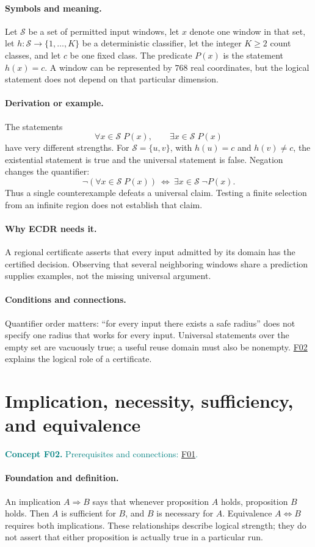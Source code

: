 \documentclass[11pt,a4paper]{article}
\newcommand{\conceptid}{Front matter}
\newcommand{\concept}[3]{\clearpage\renewcommand{\conceptid}{#1}%
\section{#2}\label{concept:#1}%
\textcolor{teal}{\textbf{Concept #1.} Prerequisites and connections: #3.}\par
\typeout{ECDR-CONCEPT-START #1 PAGE=\thepage}}
\begin{document}
\paragraph{Symbols and meaning.}
Let $\mathcal S$ be a set of permitted input windows, let $x$ denote one
window in that set, let $h:\mathcal S\to\{1,\ldots,K\}$ be a deterministic
classifier, let the integer $K\ge2$ count classes, and let $c$ be one fixed
class. The predicate $P(x)$ is the statement $h(x)=c$. A window can be
represented by $768$ real coordinates, but the logical statement does not
depend on that particular dimension.
\paragraph{Derivation or example.}
The statements
\[
 \forall x\in\mathcal S\;P(x),\qquad
 \exists x\in\mathcal S\;P(x)
\]
have very different strengths. For $\mathcal S=\{u,v\}$, with
$h(u)=c$ and $h(v)\ne c$, the existential statement is true and the
universal statement is false. Negation changes the quantifier:
\[
 \neg(\forall x\in\mathcal S\;P(x))
 \ \Longleftrightarrow\ 
 \exists x\in\mathcal S\;\neg P(x).
\]
Thus a single counterexample defeats a universal claim. Testing a finite
selection from an infinite region does not establish that claim.
\paragraph{Why ECDR needs it.}
A regional certificate asserts that every input admitted by its domain
has the certified decision. Observing that several neighboring windows
share a prediction supplies examples, not the missing universal argument.
\paragraph{Conditions and connections.}
Quantifier order matters: ``for every input there exists a safe radius''
does not specify one radius that works for every input. Universal
statements over the empty set are vacuously true; a useful reuse domain
must also be nonempty. \hyperref[concept:F02]{F02} explains the logical role of a certificate.
\par\label{endconcept:F01}

\concept{F02}{Implication, necessity, sufficiency, and equivalence}{\hyperref[concept:F01]{F01}}
\paragraph{Foundation and definition.}
An implication $A\Rightarrow B$ says that whenever proposition $A$ holds,
proposition $B$ holds. Then $A$ is sufficient for $B$, and $B$ is necessary
for $A$. Equivalence $A\Leftrightarrow B$ requires both implications.
These relationships describe logical strength; they do not assert that
either proposition is actually true in a particular run.
\end{document}
